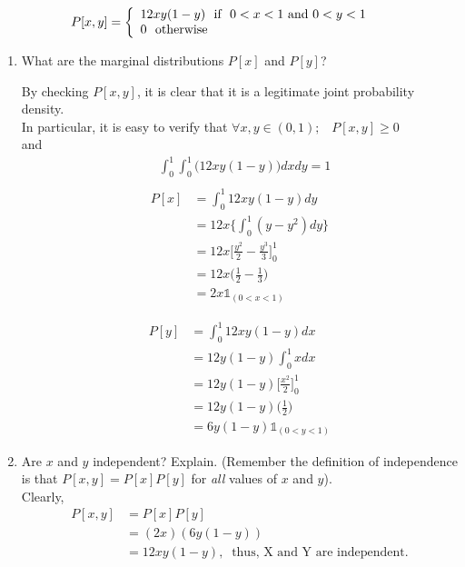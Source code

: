 \documentclass[
  12pt,
]{article}
\begin{document}
\begin{enumerate}
\begin{align}
P[x,y]=  \left\{ \begin{array}{l l} 
        12xy(1-y)\ \text{ if } \ 0<x<1 \text{ and } 0<y<1
        &\\
        0 \ \text{ otherwise }
    \end{array} \right.
\end{align}

\begin{enumerate}
\item What are the marginal distributions $P[x]$ and $P[y]$? 
{
\color{blue}
By checking $P[x,y]$, it is clear that it is a legitimate joint probability density.\\
In particular, it is easy to verify that $\forall x, y \in (0,1); \;\;\; P[x,y] \ge 0$\\ and
$$\begin{aligned}
&\int_{0}^{1} \int_{0}^{1} \Big(12xy(1-y)\Big)dxdy = 1\\
\end{aligned}$$
$$\begin{aligned}
P[x] &= \int_{0}^{1}12xy(1-y)dy\\
&= 12x\{\int_{0}^{1}(y-y^2)dy\}\\
&= 12x\Big[\frac{y^2}{2}-\frac{y^3}{3}\Big]_{0}^{1}\\
&= 12x\Big(\frac{1}{2}-\frac{1}{3}\Big)\\
&= 2x\mathbb{1}_{(0 < x<1)}
\end{aligned}$$

$$\begin{aligned}
P[y] &= \int_{0}^{1}12xy(1-y)dx\\
&= 12y(1-y)\int_{0}^{1}xdx\\
&= 12y(1-y)\Big[\frac{x^2}{2}\Big]_0^1\\
&= 12y(1-y)\Big(\frac{1}{2}\Big)\\
&= 6y(1-y)\mathbb{1}_{(0 <y<1)}
\end{aligned}$$
}

\item Are $x$ and $y$ independent? Explain. (Remember the definition of independence is that $P[x,y]=P[x]P[y]$ for \textit{all} values of $x$ and $y$).\\
{
\color{blue}
Clearly, 
$$\begin{aligned}
P[x,y] &= P[x]P[y]\\
&= (2x)(6y(1-y))\\
&= 12xy(1-y),\;\; \text{thus, X and Y are independent.}
\end{aligned}$$
}
\end{enumerate}
    

\end{enumerate}
\end{document}
